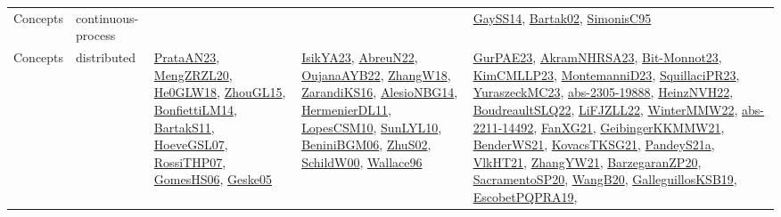 {\begin{longtable}{lp{3cm}>{\raggedright}p{6cm}>{\raggedright}p{6cm}p{8cm}}
Concepts & continuous-process &  &  & \href{papers/GaySS14.pdf}{GaySS14}\cite{GaySS14}, \href{papers/Bartak02.pdf}{Bartak02}\cite{Bartak02}, \href{papers/SimonisC95.pdf}{SimonisC95}\cite{SimonisC95}\\
Concepts & distributed & \href{articles/PrataAN23.pdf}{PrataAN23}\cite{PrataAN23}, \href{articles/MengZRZL20.pdf}{MengZRZL20}\cite{MengZRZL20}, \href{papers/He0GLW18.pdf}{He0GLW18}\cite{He0GLW18}, \href{papers/ZhouGL15.pdf}{ZhouGL15}\cite{ZhouGL15}, \href{papers/BonfiettiLM14.pdf}{BonfiettiLM14}\cite{BonfiettiLM14}, \href{articles/BartakS11.pdf}{BartakS11}\cite{BartakS11}, \href{papers/HoeveGSL07.pdf}{HoeveGSL07}\cite{HoeveGSL07}, \href{papers/RossiTHP07.pdf}{RossiTHP07}\cite{RossiTHP07}, \href{papers/GomesHS06.pdf}{GomesHS06}\cite{GomesHS06}, \href{papers/Geske05.pdf}{Geske05}\cite{Geske05} & \href{articles/IsikYA23.pdf}{IsikYA23}\cite{IsikYA23}, \href{articles/AbreuN22.pdf}{AbreuN22}\cite{AbreuN22}, \href{papers/OujanaAYB22.pdf}{OujanaAYB22}\cite{OujanaAYB22}, \href{articles/ZhangW18.pdf}{ZhangW18}\cite{ZhangW18}, \href{articles/ZarandiKS16.pdf}{ZarandiKS16}\cite{ZarandiKS16}, \href{papers/AlesioNBG14.pdf}{AlesioNBG14}\cite{AlesioNBG14}, \href{papers/HermenierDL11.pdf}{HermenierDL11}\cite{HermenierDL11}, \href{articles/LopesCSM10.pdf}{LopesCSM10}\cite{LopesCSM10}, \href{papers/SunLYL10.pdf}{SunLYL10}\cite{SunLYL10}, \href{papers/BeniniBGM06.pdf}{BeniniBGM06}\cite{BeniniBGM06}, \href{papers/ZhuS02.pdf}{ZhuS02}\cite{ZhuS02}, \href{articles/SchildW00.pdf}{SchildW00}\cite{SchildW00}, \href{articles/Wallace96.pdf}{Wallace96}\cite{Wallace96} & \href{articles/GurPAE23.pdf}{GurPAE23}\cite{GurPAE23}, \href{articles/AkramNHRSA23.pdf}{AkramNHRSA23}\cite{AkramNHRSA23}, \href{papers/Bit-Monnot23.pdf}{Bit-Monnot23}\cite{Bit-Monnot23}, \href{papers/KimCMLLP23.pdf}{KimCMLLP23}\cite{KimCMLLP23}, \href{articles/MontemanniD23.pdf}{MontemanniD23}\cite{MontemanniD23}, \href{papers/SquillaciPR23.pdf}{SquillaciPR23}\cite{SquillaciPR23}, \href{papers/YuraszeckMC23.pdf}{YuraszeckMC23}\cite{YuraszeckMC23}, \href{articles/abs-2305-19888.pdf}{abs-2305-19888}\cite{abs-2305-19888}, \href{articles/HeinzNVH22.pdf}{HeinzNVH22}\cite{HeinzNVH22}, \href{papers/BoudreaultSLQ22.pdf}{BoudreaultSLQ22}\cite{BoudreaultSLQ22}, \href{papers/LiFJZLL22.pdf}{LiFJZLL22}\cite{LiFJZLL22}, \href{papers/WinterMMW22.pdf}{WinterMMW22}\cite{WinterMMW22}, \href{articles/abs-2211-14492.pdf}{abs-2211-14492}\cite{abs-2211-14492}, \href{articles/FanXG21.pdf}{FanXG21}\cite{FanXG21}, \href{papers/GeibingerKKMMW21.pdf}{GeibingerKKMMW21}\cite{GeibingerKKMMW21}, \href{papers/BenderWS21.pdf}{BenderWS21}\cite{BenderWS21}, \href{papers/KovacsTKSG21.pdf}{KovacsTKSG21}\cite{KovacsTKSG21}, \href{articles/PandeyS21a.pdf}{PandeyS21a}\cite{PandeyS21a}, \href{articles/VlkHT21.pdf}{VlkHT21}\cite{VlkHT21}, \href{articles/ZhangYW21.pdf}{ZhangYW21}\cite{ZhangYW21}, \href{papers/BarzegaranZP20.pdf}{BarzegaranZP20}\cite{BarzegaranZP20}, \href{articles/SacramentoSP20.pdf}{SacramentoSP20}\cite{SacramentoSP20}, \href{papers/WangB20.pdf}{WangB20}\cite{WangB20}, \href{papers/GalleguillosKSB19.pdf}{GalleguillosKSB19}\cite{GalleguillosKSB19}, \href{articles/EscobetPQPRA19.pdf}{EscobetPQPRA19}\cite{EscobetPQPRA19}, 
\end{longtable}}
